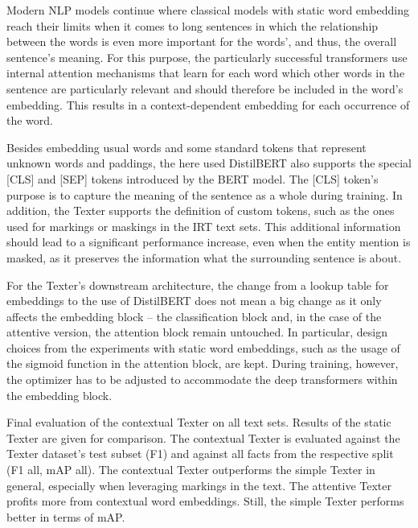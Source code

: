 Modern NLP models continue where classical models with static word embedding reach their limits when it comes to long sentences in which the relationship between the words is even more important for the words', and thus, the overall sentence's meaning. For this purpose, the particularly successful transformers use internal attention mechanisms that learn for each word which other words in the sentence are particularly relevant and should therefore be included in the word's embedding. This results in a context-dependent embedding for each occurrence of the word.

Besides embedding usual words and some standard tokens that represent unknown words and paddings, the here used DistilBERT also supports the special [CLS] and [SEP] tokens introduced by the BERT model. The [CLS] token's purpose is to capture the meaning of the sentence as a whole during training. In addition, the Texter supports the definition of custom tokens, such as the ones used for markings or maskings in the IRT text sets. This additional information should lead to a significant performance increase, even when the entity mention is masked, as it preserves the information what the surrounding sentence is about.

For the Texter's downstream architecture, the change from a lookup table for embeddings to the use of DistilBERT does not mean a big change as it only affects the embedding block -- the classification block and, in the case of the attentive version, the attention block remain untouched. In particular, design choices from the experiments with static word embeddings, such as the usage of the sigmoid function in the attention block, are kept. During training, however, the optimizer has to be adjusted to accommodate the deep transformers within the embedding block.

\begin{table}
    \centering
    
    \caption{Final evaluation of the contextual Texter on all text sets. Results of the static Texter are given for comparison. The contextual Texter is evaluated against the Texter dataset's test subset (F1) and against all facts from the respective split (F1 all, mAP all). The contextual Texter outperforms the simple Texter in general, especially when leveraging markings in the text. The attentive Texter profits more from contextual word embeddings. Still, the simple Texter performs better in terms of mAP.}
    \label{tab:5_experiments/3_texter/3_context/results}
\end{table}

